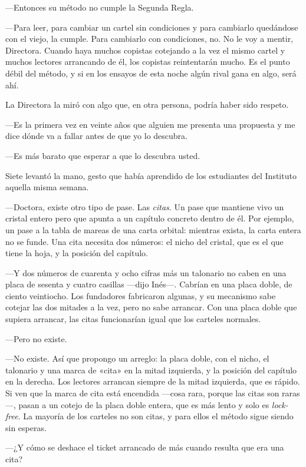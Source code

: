 ---Entonces su método no cumple la Segunda Regla.

---Para leer, para cambiar un cartel sin condiciones y para cambiarlo quedándose con el viejo, la cumple. Para cambiarlo con condiciones, no. No le voy a mentir, Directora. Cuando haya muchos copistas cotejando a la vez el mismo cartel y muchos lectores arrancando de él, los copistas reintentarán mucho. Es el punto débil del método, y si en los ensayos de esta noche algún rival gana en algo, será ahí.

La Directora la miró con algo que, en otra persona, podría haber sido respeto.

---Es la primera vez en veinte años que alguien me presenta una propuesta y me dice dónde va a fallar antes de que yo lo descubra.

---Es más barato que esperar a que lo descubra usted.

\escena
Siete levantó la mano, gesto que había aprendido de los estudiantes del Instituto aquella misma semana.

---Doctora, existe otro tipo de pase. Las \emph{citas}. Un pase que mantiene vivo un cristal entero pero que apunta a un capítulo concreto dentro de él. Por ejemplo, un pase a la tabla de mareas de una carta orbital: mientras exista, la carta entera no se funde. Una cita necesita dos números: el nicho del cristal, que es el que tiene la hoja, y la posición del capítulo.

---Y dos números de cuarenta y ocho cifras más un talonario no caben en una placa de sesenta y cuatro casillas ---dijo Inés---\nobreak. Cabrían en una placa doble, de ciento veintiocho. Los fundadores fabricaron algunas, y su mecanismo sabe cotejar las dos mitades a la vez, pero no sabe arrancar. Con una placa doble que supiera arrancar, las citas funcionarían igual que los carteles normales.

---Pero no existe.

---No existe. Así que propongo un arreglo: la placa doble, con el nicho, el talonario y una marca de «cita» en la mitad izquierda, y la posición del capítulo en la derecha. Los lectores arrancan siempre de la mitad izquierda, que es rápido. Si ven que la marca de cita está encendida ---cosa rara, porque las citas son raras---\nobreak, pasan a un cotejo de la placa doble entera, que es más lento y solo es \emph{lock-free}. La mayoría de los carteles no son citas, y para ellos el método sigue siendo sin esperas.

---¿Y cómo se deshace el ticket arrancado de más cuando resulta que era una cita?

